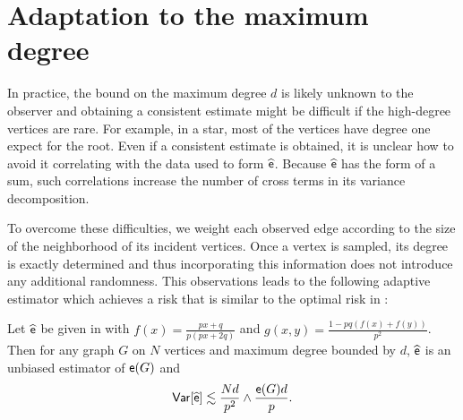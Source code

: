 
\section{Adaptation to the maximum degree} \label{app:adaptive}
In practice, the bound on the maximum degree $ d $ is likely unknown to the observer and obtaining a consistent estimate might be difficult if the high-degree vertices are rare. For example, in a star, most of the vertices have degree one expect for the root.
Even if a consistent estimate is obtained, it is unclear how to avoid it correlating with the data used to form $ \widehat{{\mathsf{e}}} $. Because $ \widehat{{\mathsf{e}}} $ has the form of a sum, such correlations increase the number of cross terms in its variance decomposition.

To overcome these difficulties, we weight each observed edge according to the size of the neighborhood of its incident vertices. Once a vertex is sampled, its degree is exactly determined and thus incorporating this information does not introduce any additional randomness. This observations leads to the following adaptive estimator which achieves a risk that is similar to the optimal risk in :
\begin{theorem} \label{thm:adaptive}
Let $\widehat{{\mathsf{e}}}$ be given in  with $ f(x) = \frac{px+q}{p(px+2q)} $ and $ g(x,y) = \frac{1-pq(f(x) + f(y))}{p^2} $. Then for any graph $ G $ on $ N $ vertices and maximum degree bounded by $ d $, $ \widehat{{\mathsf{e}}} $ is an unbiased estimator of $ {\mathsf{e}}(G) $ and
\begin{equation*}
\mathsf{Var}[\widehat{{\mathsf{e}}}] \lesssim \frac{Nd}{p^2} \wedge \frac{{\mathsf{e}}(G)d}{p}.
\end{equation*}
\end{theorem}

